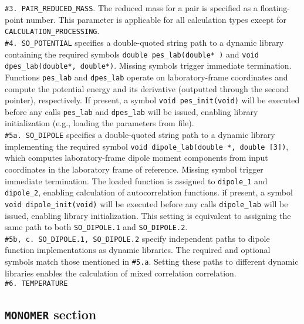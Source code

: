 \documentclass[color]{article}
\begin{document}
\noindent
\texttt{\#3. PAIR\_REDUCED\_MASS}. The reduced mass for a pair is specified as a floating-point number. This parameter is applicable for all calculation types except for \texttt{CALCULATION\_PROCESSING}. \\

\noindent
\texttt{\#4. SO\_POTENTIAL} specifies a double-quoted string path to a dynamic library containing the required symbols \texttt{double pes\_lab(double* )} and \texttt{void dpes\_lab(double*, double*)}. Missing symbols trigger immediate termination. Functions \texttt{pes\_lab} and \texttt{dpes\_lab} operate on laboratory-frame coordinates and compute the potential energy and its derivative (outputted through the second pointer), respectively. If present, a symbol \texttt{void pes\_init(void)} will be executed before any calls \texttt{pes\_lab} and \texttt{dpes\_lab} will be issued, enabling library initialization (e.g., loading the parameters from file). \\

\noindent
\texttt{\#5a. SO\_DIPOLE} specifies a double-quoted string path to a dynamic library implementing the required symbol \texttt{void dipole\_lab(double *, double [3])}, which computes laboratory-frame dipole moment components from input coordinates in the laboratory frame of reference. Missing symbol trigger immediate termination. The loaded function is assigned to \texttt{dipole\_1} and \texttt{dipole\_2}, enabling calculation of autocorrelation functions. if present, a symbol \texttt{void dipole\_init(void)} will be executed before any calls \texttt{dipole\_lab} will be issued, enabling library initialization. This setting  is equivalent to assigning the same path to both \texttt{SO\_DIPOLE.1} and \texttt{SO\_DIPOLE.2}. \\

\noindent
\texttt{\#5b, c. SO\_DIPOLE.1, SO\_DIPOLE.2} specify independent paths to dipole function implementations as dynamic libraries. The required and optional symbols match those mentioned in \texttt{\#5.a}. Setting these paths to different dynamic libraries enables the calculation of mixed correlation correlation. \\ 

\noindent
\texttt{\#6. TEMPERATURE}

\subsection{\texttt{MONOMER} section}
\label{subsec:monomer-section}
\end{document}
